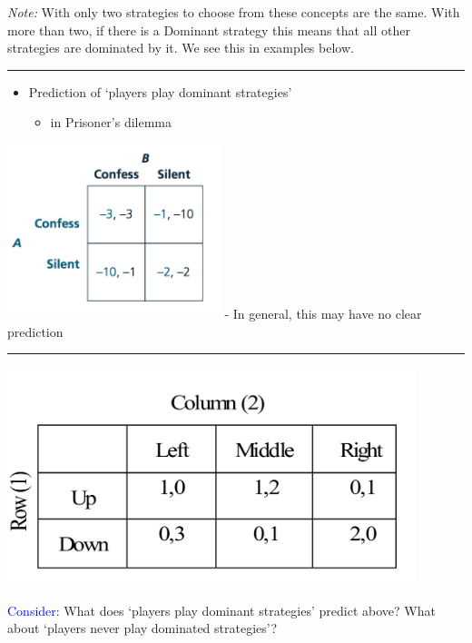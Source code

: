 \documentclass[]{article}
\providecommand{\tightlist}{%
  \setlength{\itemsep}{0pt}\setlength{\parskip}{0pt}}
\begin{document}
\bigskip

\emph{Note:} With only two strategies to choose from these concepts are
the same. With more than two, if there is a Dominant strategy this means
that all other strategies are dominated by it. We see this in examples
below.

\begin{center}\rule{0.5\linewidth}{\linethickness}\end{center}

\begin{itemize}
\tightlist
\item
  Prediction of `players play dominant strategies'

  \begin{itemize}
  \tightlist
  \item
    in Prisoner's dilemma
  \end{itemize}
\end{itemize}

\includegraphics[height=2in]{picsfigs/pd_normal.png} - In general, this
may have no clear prediction

\begin{center}\rule{0.5\linewidth}{\linethickness}\end{center}

\includegraphics[height=2.5in]{picsfigs/matrixforISD.png}

\textcolor{blue}{Consider}: What does `players play dominant strategies'
predict above? What about `players never play dominated strategies'?
\end{document}
